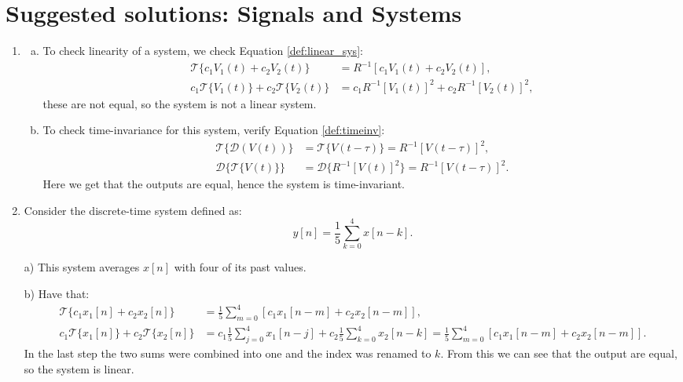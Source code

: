 \newpage
\section{Suggested solutions: Signals and Systems}
\begin{enumerate}
\item

\begin{enumerate}[a)]
\item To check linearity of a system, we check Equation \ref{def:linear_sys}:
\begin{align*}
    \mathcal{T}\{c_{1}V_{1}(t)+c_{2}V_{2}(t)\}&=R^{-1}[c_{1}V_{1}(t)+c_{2}V_{2}(t)], \\
    c_{1}\mathcal{T}\{V_{1}(t)\}+c_{2}\mathcal{T}\{V_{2}(t)\} &=c_{1}R^{-1}[V_{1}(t)]^{2} + c_{2}R^{-1}[V_{2}(t)]^{2},
\end{align*}
these are not equal, so the system is not a linear system. 

\item To check time-invariance for this system, verify Equation \ref{def:timeinv}:
\begin{align*}
    \mathcal{T}\{\mathcal{D}(V(t))\}&=\mathcal{T}\{V(t-\tau)\}=R^{-1}[V(t-\tau)]^{2}, \\
    \mathcal{D}\{\mathcal{T}\{V(t)\}\}&=\mathcal{D}\{R^{-1}[V(t)]^{2}\}=R^{-1}[V(t-\tau)]^{2}.
\end{align*}
Here we get that the outputs are equal, hence the system is time-invariant. 
\end{enumerate}

\item
Consider the discrete-time system defined as:
$$y[n]=\frac{1}{5}\sum_{k=0}^{4}x[n-k].$$

\item[a)]
This system averages $x[n]$ with four of its past values. 

\item[b)] Have that:
\begin{align*}
    \mathcal{T}\{c_{1}x_{1}[n]+c_{2}x_{2}[n]\} &= \frac{1}{5}\sum_{m=0}^{4}[c_{1}x_{1}[n-m]+c_{2}x_{2}[n-m]], \\
    c_{1}\mathcal{T}\{x_{1}[n]\}+c_{2}\mathcal{T}\{x_{2}[n]\}&=c_{1}\frac{1}{5}\sum_{j=0}^{4}x_{1}[n-j]+c_{2}\frac{1}{5}\sum_{k=0}^{4}x_{2}[n-k]
    =\frac{1}{5}\sum_{m=0}^{4}[c_{1}x_{1}[n-m]+c_{2}x_{2}[n-m]].
\end{align*}
In the last step the two sums were combined into one and the index was renamed to $k$. 
From this we can see that the output are equal, so the system is linear. 


\end{enumerate}
